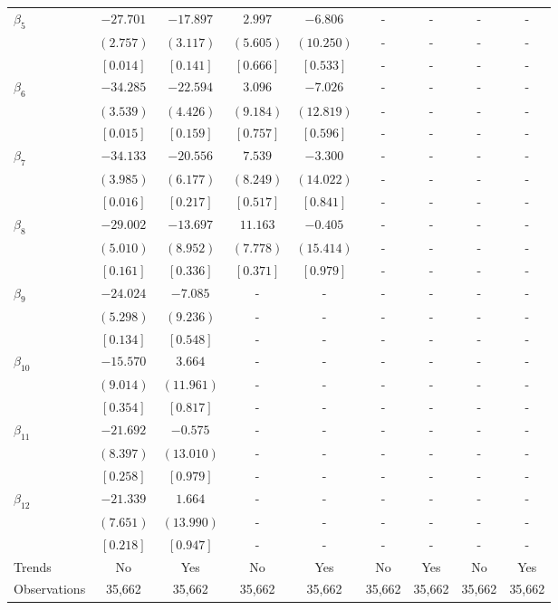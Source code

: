 \documentclass[12pt]{article}
\begin{document}
\begin{table}[h!]
\begin{adjustbox}{scale=0.7}
\begin{tabular}{lcccccccc}
$\beta_{5}$ & $-27.701$ & $-17.897$ & $  2.997$ & $ -6.806$ & - & - & - & - \\
& $(  2.757)$ & $(  3.117)$ & $(  5.605)$ & $( 10.250)$ & - & - & - & - \\
& $[  0.014]$ & $[  0.141]$ & $[  0.666]$ & $[  0.533]$ & - & - & - & - \\
$\beta_{6}$ & $-34.285$ & $-22.594$ & $  3.096$ & $ -7.026$ & - & - & - & - \\
& $(  3.539)$ & $(  4.426)$ & $(  9.184)$ & $( 12.819)$ & - & - & - & - \\
& $[  0.015]$ & $[  0.159]$ & $[  0.757]$ & $[  0.596]$ & - & - & - & - \\
$\beta_{7}$ & $-34.133$ & $-20.556$ & $  7.539$ & $ -3.300$ & - & - & - & - \\
& $(  3.985)$ & $(  6.177)$ & $(  8.249)$ & $( 14.022)$ & - & - & - & - \\
& $[  0.016]$ & $[  0.217]$ & $[  0.517]$ & $[  0.841]$ & - & - & - & - \\
$\beta_{8}$ & $-29.002$ & $-13.697$ & $ 11.163$ & $ -0.405$ & - & - & - & - \\
& $(  5.010)$ & $(  8.952)$ & $(  7.778)$ & $( 15.414)$ & - & - & - & - \\
& $[  0.161]$ & $[  0.336]$ & $[  0.371]$ & $[  0.979]$ & - & - & - & - \\
$\beta_{9}$ & $-24.024$ & $ -7.085$ & - & - & - & - & - & - \\
& $(  5.298)$ & $(  9.236)$ & - & - & - & - & - & - \\
& $[  0.134]$ & $[  0.548]$ & - & - & - & - & - & - \\
$\beta_{10}$ & $-15.570$ & $  3.664$ & - & - & - & - & - & - \\
& $(  9.014)$ & $( 11.961)$ & - & - & - & - & - & - \\
& $[  0.354]$ & $[  0.817]$ & - & - & - & - & - & - \\
$\beta_{11}$ & $-21.692$ & $ -0.575$ & - & - & - & - & - & - \\
& $(  8.397)$ & $( 13.010)$ & - & - & - & - & - & - \\
& $[  0.258]$ & $[  0.979]$ & - & - & - & - & - & - \\
$\beta_{12}$ & $-21.339$ & $  1.664$ & - & - & - & - & - & - \\
& $(  7.651)$ & $( 13.990)$ & - & - & - & - & - & - \\
& $[  0.218]$ & $[  0.947]$ & - & - & - & - & - & - \\
\midrule
Trends & No & Yes & No & Yes & No & Yes & No & Yes \\
Observations & 35,662 & 35,662 & 35,662 & 35,662 & 35,662 & 35,662 & 35,662 & 35,662 \\
\bottomrule
\end{tabular}
\end{adjustbox}
\end{table}
\end{document}
